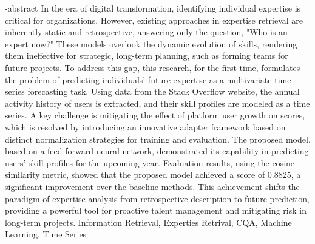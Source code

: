 \documentclass[oneside,openany,msc]{SBU-Thesis}
\begin{document}
\en-abstract{
In the era of digital transformation, identifying individual expertise is critical for organizations. However, existing approaches in expertise retrieval are inherently static and retrospective, answering only the question, "Who is an expert now?" These models overlook the dynamic evolution of skills, rendering them ineffective for strategic, long-term planning, such as forming teams for future projects.
To address this gap, this research, for the first time, formulates the problem of predicting individuals' future expertise as a multivariate time-series forecasting task. Using data from the Stack Overflow website, the annual activity history of users is extracted, and their skill profiles are modeled as a time series. A key challenge is mitigating the effect of platform user growth on scores, which is resolved by introducing an innovative adapter framework based on distinct normalization strategies for training and evaluation.
The proposed model, based on a feed-forward neural network, demonstrated its capability in predicting users' skill profiles for the upcoming year. Evaluation results, using the cosine similarity metric, showed that the proposed model achieved a score of 0.8825, a significant improvement over the baseline methods. This achievement shifts the paradigm of expertise analysis from retrospective description to future prediction, providing a powerful tool for proactive talent management and mitigating risk in long-term projects.
}
\latinkeywords
{
	Information Retrieval, Experties Retrival, CQA, Machine Learning, Time Series
}


\latinAbstractPage %
\latinFirstPage %

	
\end{document}
